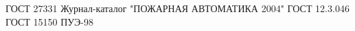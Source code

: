 \begin{thebibliography}{99}


ГОСТ 27331
 Журнал-каталог "ПОЖАРНАЯ АВТОМАТИКА 2004"
 ГОСТ 12.3.046
 ГОСТ 15150
 ПУЭ-98


\end{thebibliography}
